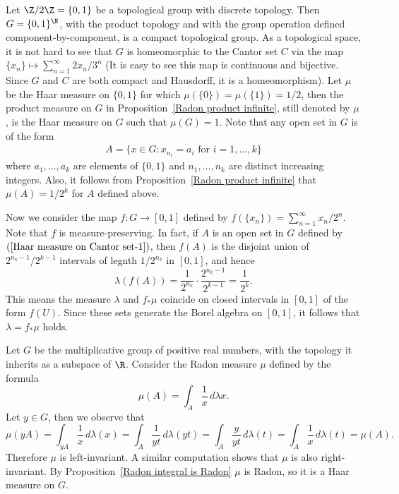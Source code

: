 \begin{example}\label{Haar measure on Cantor set}
Let $\Z/2\Z=\{0,1\}$ be a topological group with discrete topology. Then $G=\{0,1\}^\N$, with the product topology and with the group operation defined component-by-component, is a compact topological group. As a topological space, it is not hard to see that $G$ is homeomorphic to the Cantor set $C$ via the map $\{x_n\}\mapsto\sum_{n=1}^{\infty}2x_n/3^n$ (It is easy to see this map is continuous and bijective. Since $G$ and $C$ are both compact and Hausdorff, it is a homeomorphism). Let $\mu$ be the Haar measure on $\{0,1\}$ for which $\mu(\{0\})=\mu(\{1\})=1/2$, then the product measure on $G$ in Proposition~\ref{Radon product infinite}, still denoted by $\mu$, is the Haar measure on $G$ such that $\mu(G)=1$. Note that any open set in $G$ is of the form
\begin{align}\label{Haar measure on Cantor set-1}
A=\{x\in G:x_{n_i}=a_i\text{ for $i=1,\dots,k$}\}
\end{align}
where $a_1,\dots,a_k$ are elements of $\{0,1\}$ and $n_1,\dots,n_k$ are distinct increasing integers. Also, it follows from Proposition~\ref{Radon product infinite} that $\mu(A)=1/2^k$ for $A$ defined above.\par
Now we consider the map $f:G\to[0,1]$ defined by $f(\{x_n\})=\sum_{n=1}^{\infty}x_n/2^n$. Note that $f$ is measure-preserving. In fact, if $A$ is an open set in $G$ defined by $(\ref{Haar measure on Cantor set-1})$, then $f(A)$ is the disjoint union of $2^{n_k-1}/2^{k-1}$ intervals of legnth $1/2^{n_k}$ in $[0,1]$, and hence
\[\lambda(f(A))=\frac{1}{2^{n_k}}\cdot\frac{2^{n_k-1}}{2^{k-1}}=\frac{1}{2^k}.\]
This means the measure $\lambda$ and $f_*\mu$ coincide on closed intervals in $[0,1]$ of the form $f(U)$. Since these sets generate the Borel algebra on $[0,1]$, it follows that $\lambda=f_*\mu$ holds.
\end{example}
\begin{example}\label{Haar measure on R_+}
Let $G$ be the multiplicative group of positive real numbers, with the topology it inherits as a subspace of $\R$. Consider the Radon measure $\mu$ defined by the formula
\[\mu(A)=\int_A\frac{1}{x}\,d\lambda x.\]
Let $y\in G$, then we observe that
\[\mu(yA)=\int_{yA}\frac{1}{x}\,d\lambda(x)=\int_{A}\frac{1}{yt}\,d\lambda(yt)=\int_A\frac{y}{yt}\,d\lambda(t)=\int_A\frac{1}{x}\,d\lambda(t)=\mu(A).\]
Therefore $\mu$ is left-invariant. A similar computation shows that $\mu$ is also right-invariant. By Proposition~\ref{Radon integral is Radon} $\mu$ is Radon, so it is a Haar measure on $G$.
\end{example}
